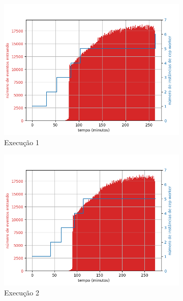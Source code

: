  \afterpage{\clearpage}
\begin{figure}[h!]
\begin{subfigure}{.5\textwidth}
  \centering
  \includegraphics[width=\linewidth]{figuras/graphics/carga_e_workers_total6-dez-is.png}  
  \caption{Execução 1}
  \label{fig:cewt-6-dez-is}
\end{subfigure}
\begin{subfigure}{.5\textwidth}
  \centering
  \includegraphics[width=\linewidth]{figuras/graphics/carga_e_workers_total7-dez-is.png}  
  \caption{Execução 2}
  \label{fig:cewt-7-dez-is}
\end{subfigure}
\begin{subfigure}{.5\textwidth}

\end{subfigure}
\end{figure}
